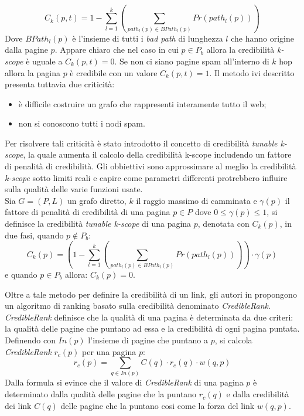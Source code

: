 \begin{equation}
 C_k(p,t)=1-\sum_{l=1}^k\left (\sum_{path_l(p)\in BPath_l(p)}Pr(path_l(p))\right )
\end{equation}
Dove \(BPath_l(p)\) è l'insieme di tutti i \textit{bad path} di lunghezza \(l\) che hanno origine dalla pagine \(p\). Appare chiaro che nel caso in cui \(p\in P_b\) allora la credibilità \textit{k-scope} è uguale a \(C_k(p,t)=0\). Se non ci siano pagine spam all'interno di \(k\) hop  allora la pagina \(p\) è credibile con un valore \(C_k(p,t)=1\). Il metodo ivi descritto presenta tuttavia due criticità:
\begin{itemize}
 \item è difficile costruire un grafo che rappresenti interamente tutto il web;
 \item non si conoscono tutti i nodi spam.
\end{itemize}
 Per risolvere tali criticità è stato introdotto il concetto di credibilità \textit{tunable k-scope}, la quale aumenta il calcolo della credibilità k-scope includendo un fattore di penalità di credibilità. Gli obbiettivi sono approssimare al meglio la credibilità \textit{k-scope} sotto limiti reali e capire come parametri differenti protrebbero influire sulla qualità delle varie funzioni usate. \\Sia \(G=(P,L)\) un grafo diretto, \(k\) il raggio massimo di camminata e \(\gamma(p)\) il fattore di penalità di credibilità di una pagina \(p\in P\) dove \(0\leq \gamma(p)\leq 1\), si definisce la credibilità \textit{tunable k-scope} di una pagina \(p\), denotata con \(C_k(p)\), in due fasi, quando \(p \not \in P_b\):
\begin{equation} 
C_k(p)=\left ( 1 -\sum_{l=1}^k \left ( \sum_{path_l(p)\in BPath_l(p)} Pr(path_l(p)) \right ) \right ) \cdot\gamma(p)
\end{equation}
e quando \(p\in P_b\) allora: \(C_k(p)=0\).

Oltre a tale metodo per definire la credibilità di un link, gli autori in \cite{Caverlee:2007:CWS:1281100.1281124} propongono un algoritmo di ranking  basato sulla credibilità denominato \textit{CredibleRank}. \textit{CredibleRank} definisce che la qualità di una pagina è determinata da due criteri: la qualità delle pagine che puntano ad essa e la credibilità di ogni pagina puntata. Definendo con \(In(p)\) l'insieme di pagine che puntano a \(p\), si calcola \textit{CredibleRank} \(r_c(p)\) per una pagina \(p\):
\begin{equation}
r_c(p)=\sum_{q\in In(p)}C(q)\cdot r_c(q)\cdot w(q,p)
\end{equation}
Dalla formula si evince che il valore di \textit{CredibleRank} di una pagina \(p\) è determinato dalla qualità delle pagine che la puntano \(r_c(q)\) e dalla credibilità dei link \(C(q)\) delle pagine che la puntano cosi come la forza del link \(w(q,p)\).

